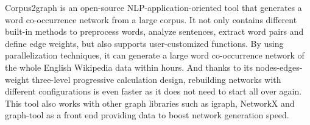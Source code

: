 Corpus2graph is an open-source NLP-application-oriented tool that generates a word co-occurrence network from a large corpus. It not only contains different built-in methods to preprocess words, analyze sentences, extract word pairs and define edge weights, but also supports user-customized functions. By using parallelization techniques, it can generate a large word co-occurrence network of the whole English Wikipedia data within hours. And thanks to its nodes-edges-weight three-level progressive calculation design, rebuilding networks with different configurations is even faster as it does not need to start all over again. This tool also works with other graph libraries such as igraph, NetworkX and graph-tool as a front end providing data to boost network generation speed.
